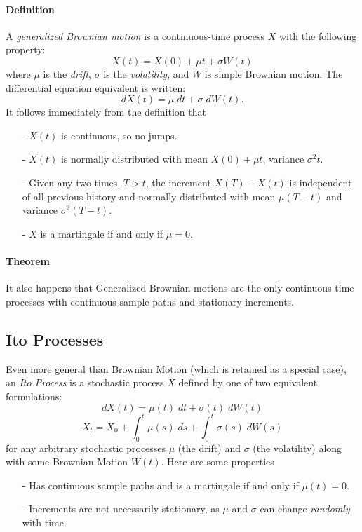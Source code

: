 \documentclass[12pt]{article}
\theoremstyle{plain}
\theoremstyle{definition}
\theoremstyle{remark}
\begin{document}
\paragraph{Definition} A \emph{generalized Brownian motion} is a
continuous-time process $X$ with the following property:
   \[ X(t) = X(0)+\mu t + \sigma W(t) \]
where $\mu$ is the \emph{drift}, $\sigma$ is the \emph{volatility},
and $W$ is simple Brownian motion. The differential equation
equivalent is written:
   \[ dX(t) = \mu \; dt + \sigma \; dW(t).\]
It follows immediately from the definition that
\begin{itemize}
   \item[-]{$X(t)$ is continuous, so no jumps.}
   \item[-]{$X(t)$ is normally distributed with mean $X(0)+\mu t$,
      variance $\sigma^2 t$.
      }
   \item[-]{Given any two times, $T>t$, the increment $X(T) - X(t)$ is
      independent of all previous history and normally distributed
      with mean $\mu(T-t)$ and variance $\sigma^2(T-t)$.}
   \item[-]{$X$ is a martingale if and only if $\mu = 0$.}
\end{itemize}
\paragraph{Theorem} It also happens that Generalized Brownian motions
are the only continuous time processes with continuous sample
paths and stationary increments.

\subsection{Ito Processes}

Even more general than Brownian Motion (which is retained as a special
case), an \emph{Ito Process} is
a stochastic process $X$ defined by one of two equivalent formulations:
   \[ dX(t) = \mu(t) \; dt + \sigma(t) \; dW(t) \]
   \[ X_t = X_0 + \int^t_0 \mu(s) \; ds + \int^t_0 \sigma(s) \; dW(s)
      \]
for any arbitrary stochastic processes $\mu$ (the drift) and $\sigma$
(the volatility) along with some Brownian Motion $W(t)$.  Here are
some properties
\begin{itemize}
   \item[-]{Has continuous sample paths and is a martingale if and only
      if $\mu(t) = 0$. }
   \item[-]{Increments are not necessarily stationary, as $\mu$ and
	 $\sigma$ can change \emph{randomly} with time.}
\end{itemize}
\end{document}
